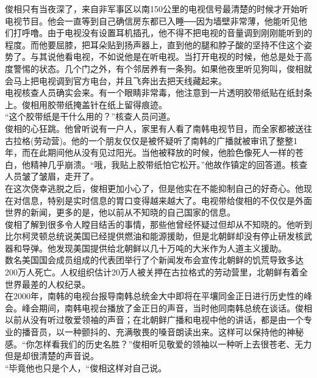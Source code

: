 俊相只有当夜深了，来自非军事区以南150公里的电视信号最清楚的时候才开始听电视节目。他会一直等到自己确信房东都已入睡──因为墙壁非常薄，他能听见他们打呼噜。由于电视没有设置耳机插孔，他不得不把电视的音量调到刚刚能听到的程度。而他要屈膝，把耳朵贴到扬声器上，直到他的腿和脖子酸的坚持不住这个姿势了。与其说他看电视，不如说他是在听电视。当打开电视的时候，他总是处于高度警惕的状态。几个门之外，有个邻居养有一条狗。如果他夜里听见狗叫，俊相就会马上把电视调到官方电台，并且飞奔出去把天线藏起来。\\

电视核查人员确实会来。有一个眼睛非常毒，他注意到一片透明胶带纸贴在纸封条上。俊相用胶带纸掩盖针在纸上留得痕迹。\\

“这个胶带纸是干什么用的？”核查人员问道。\\

俊相的心狂跳。他曾听说有一户人，家里有人看了南韩电视节目，而全家都被送往古拉格(劳动营)。他的一个朋友仅仅是被怀疑听了南韩的广播就被审讯了整整1年，而在此期间他从没有见过阳光。当他被释放的时候，他脸色像死人一样的苍白，他精神几乎崩溃。“哦，我贴上胶带纸怕它松开。”他故作镇定的回答道。核查人员皱了皱眉，走开了。\\

在这次侥幸逃脱之后，俊相更加小心了，但是他实在不能抑制自己的好奇心。他现在对信息，特别是实时信息的胃口变得越来越大了。电视带给俊相的不仅仅是外面世界的新闻，更多的是，他以前从不知晓的自己国家的信息。\\

俊相了解到很多令人瞠目结舌的事情，那些他曾经怀疑过但却从不知晓的。他听到比尔柯灵顿总统说美国已经提供燃油和能源援助，但是北朝鲜却没有停止研发核武器和导弹。他发现美国提供给北朝鲜以几十万吨的大米作为人道主义援助。\\

数名美国国会成员组成的代表团举行了个新闻发布会宣传北朝鲜的饥荒导致多达200万人死亡。人权组织估计20万人被关押在古拉格式的劳动营里，北朝鲜有着全世界最差的人权纪录。\\

在2000年，南韩的电视台报导南韩总统金大中即将在平壤同金正日进行历史性的峰会。峰会期间，南韩电视台播放了金正日的声音，当时他同南韩总统在谈话。俊相以前从没有听过敬爱领袖的声音；在北朝鲜广播和电视中他的讲话，都是由一个专业的播音员，以一种颤抖的、充满敬畏的嗓音朗读出来。这样可以保持他的神秘感。“你怎样看我们的历史名胜？”俊相听见敬爱的领袖以一种听上去很苍老、无力但是却很清楚的声音说。\\

“毕竟他也只是个人，“俊相这样对自己说。\\

